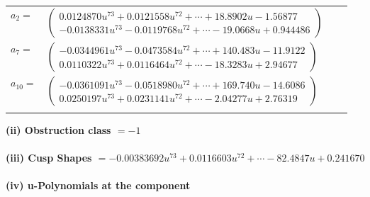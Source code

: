 \documentclass[1p]{elsarticle_modified}
\theoremstyle{definition}
\begin{document}
\begin{tabular}{m{7pt} m{180pt} m{7pt} m{180pt} }
\flushright $a_{2}=$&$\begin{pmatrix}0.0124870 u^{73}+0.0121558 u^{72}+\cdots+18.8902 u-1.56877\\-0.0138331 u^{73}-0.0119768 u^{72}+\cdots-19.0668 u+0.944486\end{pmatrix}$ \\
\flushright $a_{7}=$&$\begin{pmatrix}-0.0344961 u^{73}-0.0473584 u^{72}+\cdots+140.483 u-11.9122\\0.0110322 u^{73}+0.0116464 u^{72}+\cdots-18.3283 u+2.94677\end{pmatrix}$ \\
\flushright $a_{10}=$&$\begin{pmatrix}-0.0361091 u^{73}-0.0518980 u^{72}+\cdots+169.740 u-14.6086\\0.0250197 u^{73}+0.0231141 u^{72}+\cdots-2.04277 u+2.76319\end{pmatrix}$\\&\end{tabular}
\flushleft \textbf{(ii) Obstruction class $= -1$}\\~\\
\flushleft \textbf{(iii) Cusp Shapes $= -0.00383692 u^{73}+0.0116603 u^{72}+\cdots-82.4847 u+0.241670$}\\~\\
\newpage\renewcommand{\arraystretch}{1}
\flushleft \textbf{(iv) u-Polynomials at the component}\newline \\
\end{document}
